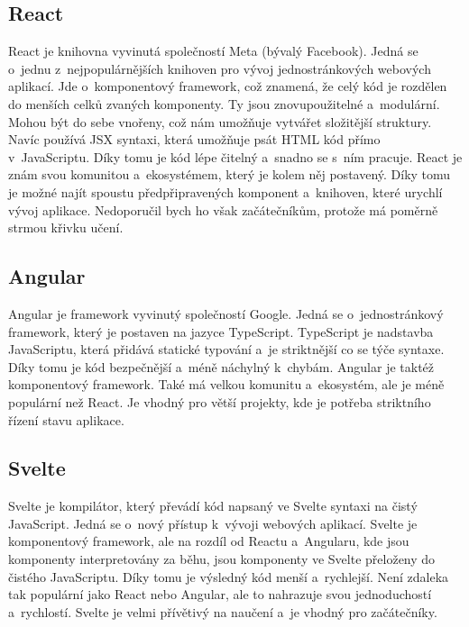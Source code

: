 \subsection*{React}
\label{subsec:react}

React je knihovna vyvinutá společností Meta (bývalý Facebook). Jedná se o~jednu z~nejpopulárnějších knihoven pro vývoj jednostránkových webových aplikací. Jde o~komponentový framework, což znamená, že celý kód je rozdělen do menších celků zvaných komponenty. Ty jsou znovupoužitelné a~modulární. Mohou být do sebe vnořeny, což nám umožňuje vytvářet složitější struktury. Navíc používá JSX syntaxi, která umožňuje psát HTML kód přímo v~JavaScriptu. Díky tomu je kód lépe čitelný a~snadno se s~ním pracuje. React je znám svou komunitou a~ekosystémem, který je kolem něj postavený. Díky tomu je možné najít spoustu předpřipravených komponent a~knihoven, které urychlí vývoj aplikace. Nedoporučil bych ho však začátečníkům, protože má poměrně strmou křivku učení.

\subsection*{Angular}
\label{subsec:angular}

Angular je framework vyvinutý společností Google. Jedná se o~jednostránkový framework, který je postaven na jazyce TypeScript. TypeScript je nadstavba JavaScriptu, která přidává statické typování a~je striktnější co se týče syntaxe. Díky tomu je kód bezpečnější a~méně náchylný k~chybám. Angular je taktéž komponentový framework. Také má velkou komunitu a~ekosystém, ale je méně populární než React. Je vhodný pro větší projekty, kde je potřeba striktního řízení stavu aplikace.

\pagebreak
\subsection*{Svelte}
\label{subsec:svelte}

Svelte je kompilátor, který převádí kód napsaný ve Svelte syntaxi na čistý JavaScript. Jedná se o~nový přístup k~vývoji webových aplikací. Svelte je komponentový framework, ale na rozdíl od Reactu a~Angularu, kde jsou komponenty interpretovány za běhu, jsou komponenty ve Svelte přeloženy do čistého JavaScriptu. Díky tomu je výsledný kód menší a~rychlejší. Není zdaleka tak populární jako React nebo Angular, ale to nahrazuje svou jednoduchostí a~rychlostí. Svelte je velmi přívětivý na naučení a~je vhodný pro začátečníky.

